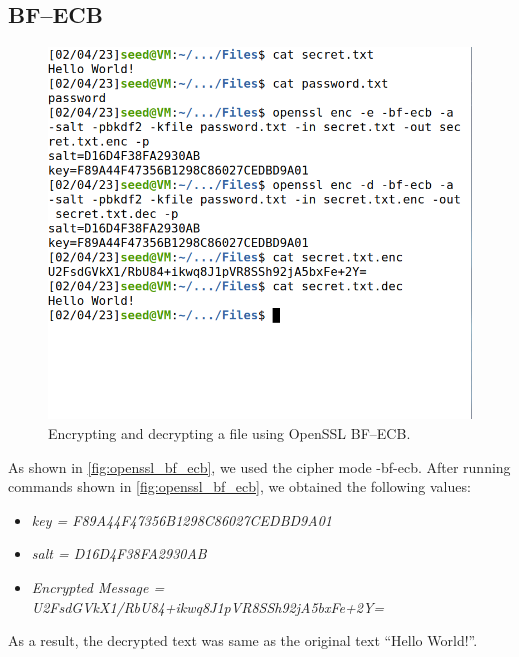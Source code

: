 \subsection{BF--ECB}
%
\begin{figure}
    \centering
    \includegraphics[height=\textheight,width=\textwidth,keepaspectratio]
    {figures/bf-ecb-enc-dec.png}
    \caption{Encrypting and decrypting a file using OpenSSL BF--ECB.}
    \label{fig:openssl_bf_ecb}
\end{figure}

As shown in \autoref{fig:openssl_bf_ecb}, we used the cipher mode
{\selectfont -bf-ecb}. After running commands shown
in \autoref{fig:openssl_bf_ecb}, we obtained the following values:

\begin{itemize}
    \item \emph{key = F89A44F47356B1298C86027CEDBD9A01}
    \item \emph{salt = D16D4F38FA2930AB}
    \item \emph{Encrypted Message = U2FsdGVkX1/RbU84+ikwq8J1pVR8SSh92jA5bxFe+2Y=}
\end{itemize}

As a result, the decrypted text was same as the original text ``Hello World!''.